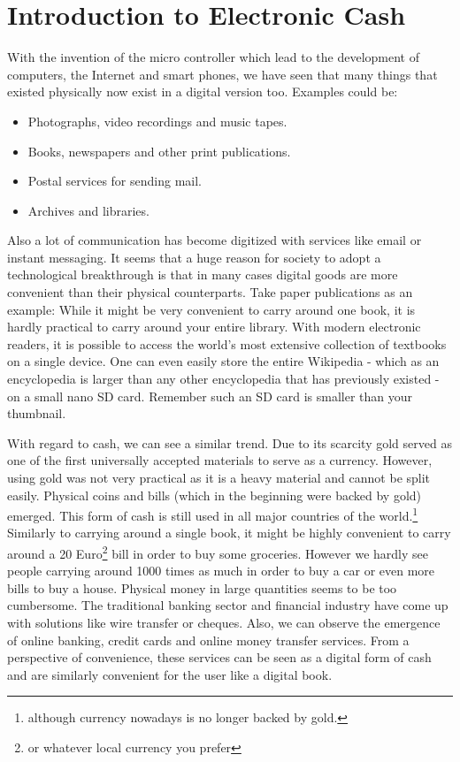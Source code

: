 \documentclass[ebook,12pt,oneside,openany]{memoir}
\begin{document}
\section{Introduction to Electronic Cash}
With the invention of the micro controller which lead to the development of computers, the Internet and smart phones, we have seen that many things that existed physically now exist in a digital version too.
Examples could be:
\begin{itemize}
\item Photographs, video recordings and music tapes.
\item Books, newspapers and other print publications.
\item Postal services for sending mail.
\item Archives and libraries.
\end{itemize}

Also a lot of communication has become digitized with services like email or instant messaging.
It seems that a huge reason for society to adopt a technological breakthrough is that in many cases digital goods are more convenient than their physical counterparts.
Take paper publications as an example: While it might be very convenient to carry around one book, it is hardly practical to carry around your entire library.
With modern electronic readers, it is possible to access the world's most extensive collection of textbooks on a single device.
One can even easily store the entire Wikipedia - which as an encyclopedia is larger than any other encyclopedia that has previously existed - on a small nano SD card.
Remember such an SD card is smaller than your thumbnail.

With regard to cash, we can see a similar trend.
Due to its scarcity gold served as one of the first universally accepted materials to serve as a currency.
However, using gold was not very practical as it is a heavy material and cannot be split easily.
Physical coins and bills (which in the beginning were backed by gold) emerged.
This form of cash is still used in all major countries of the world.\footnote{although currency nowadays is no longer backed by gold.}
Similarly to carrying around a single book, it might be highly convenient to carry around a 20 Euro\footnote{or whatever local currency you prefer} bill in order to buy some groceries. However we hardly see people carrying around 1000 times as much in order to buy a car or even more bills to buy a house.
Physical money in large quantities seems to be too cumbersome. 
The traditional banking sector and financial industry have come up with solutions like wire transfer or cheques.
Also, we can observe the emergence of online banking, credit cards and online money transfer services.
From a perspective of convenience, these services can be seen as a digital form of cash and are similarly convenient for the user like a digital book.
\end{document}
